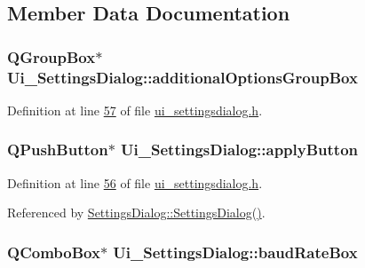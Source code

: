 \subsection{Member Data Documentation}
\hypertarget{a00029_a996d0cf4818dae895375cb43b996e0dc}{
\subsubsection[{additional\+Options\+Group\+Box}]{\setlength{\rightskip}{0pt plus 5cm}Q\+Group\+Box$\ast$ Ui\+\_\+\+Settings\+Dialog\+::additional\+Options\+Group\+Box}}\label{a00029_a996d0cf4818dae895375cb43b996e0dc}


Definition at line \hyperlink{a00054_source_l00057}{57} of file \hyperlink{a00054_source}{ui\+\_\+settingsdialog.\+h}.

\hypertarget{a00029_adc885543c05d0026019ec678b4d08c5c}{
\subsubsection[{apply\+Button}]{\setlength{\rightskip}{0pt plus 5cm}Q\+Push\+Button$\ast$ Ui\+\_\+\+Settings\+Dialog\+::apply\+Button}}\label{a00029_adc885543c05d0026019ec678b4d08c5c}


Definition at line \hyperlink{a00054_source_l00056}{56} of file \hyperlink{a00054_source}{ui\+\_\+settingsdialog.\+h}.



Referenced by \hyperlink{a00044_source_l00052}{Settings\+Dialog\+::\+Settings\+Dialog()}.

\hypertarget{a00029_a766a61db4a8c72219543f7c096ae5601}{
\subsubsection[{baud\+Rate\+Box}]{\setlength{\rightskip}{0pt plus 5cm}Q\+Combo\+Box$\ast$ Ui\+\_\+\+Settings\+Dialog\+::baud\+Rate\+Box}}\label{a00029_a766a61db4a8c72219543f7c096ae5601}


